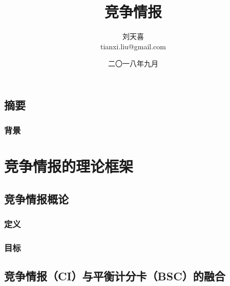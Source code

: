 \documentclass[UTF8,12pt,a4paper]{ctexbook}
\title{竞争情报}
\author{刘天喜 \\ tianxi.liu@gmail.com}
\date{二〇一八年九月}
\begin{document}
\maketitle
\tableofcontents

\chapter*{摘要}

\section{背景}


\part{竞争情报的理论框架}

\chapter{竞争情报概论}

\section{定义}

\section{目标}

\chapter{竞争情报（CI）与平衡计分卡（BSC）的融合}
\end{document}
